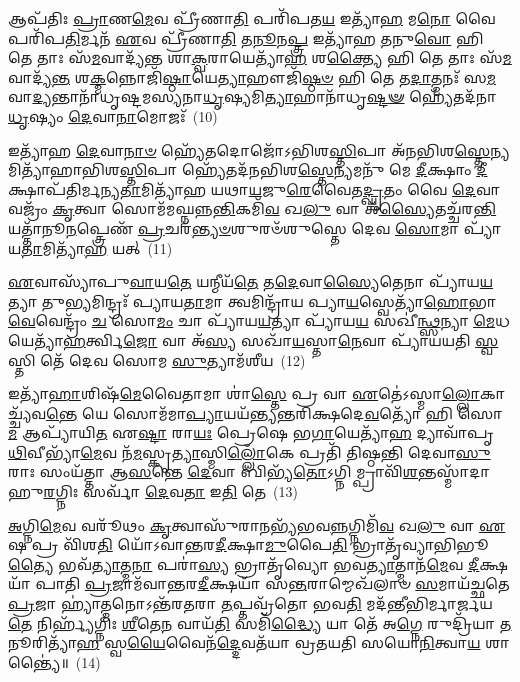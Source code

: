 𑌆𑌪᳴𑌤𑌿𑌃 \ul{𑌪𑍍𑌰𑌾}\-𑌣\-\ul{𑌮𑍇}\-𑌵 𑌪𑍍𑌰𑍀᳴𑌣𑌾\-\ul{𑌤𑌿} 𑌪𑌰𑌿᳴𑌪𑌤\-\ul{𑌯} 𑌇𑌤𑍍𑌯𑌾᳴\-\ul{𑌹} 𑌮\-\ul{𑌨𑍋} 𑌵𑍈 𑌪𑌰𑌿᳴𑌪\-\ul{𑌤𑌿}\-𑌰𑍍𑌮𑌨᳴ \ul{𑌏}\-𑌵 𑌪𑍍𑌰𑍀᳴𑌣𑌾\-\ul{𑌤𑌿} 𑌤\-\ul{𑌨𑍂}\-𑌨\-\ul{𑌪𑍍𑌤𑍍𑌰} 𑌇𑌤𑍍𑌯𑌾᳴𑌹 \ul{𑌤}\-𑌨𑍁\-\ul{𑌵𑍋} 𑌹𑌿 𑌤𑍇 𑌤𑌾𑌃 𑌸᳴\-\ul{𑌮}\-𑌵𑌾𑌦𑍍𑌯᳴𑌨𑍍𑌤 𑌶𑌾\-\ul{𑌕𑍍𑌵}\-𑌰𑌾𑌯𑍇𑌤𑍍𑌯𑌾᳴\-\ul{𑌹} 𑌶\-\ul{𑌕𑍍𑌤𑍍𑌯𑍈} 𑌹𑌿 𑌤𑍇 𑌤𑌾𑌃 𑌸᳴\-\ul{𑌮}\-𑌵𑌾𑌦𑍍𑌯᳴\-\ul{𑌨𑍍𑌤} 𑌶\-\ul{𑌕𑍍𑌮}\-𑌨𑍍𑌨𑍋𑌜𑌿᳴\-\ul{𑌷𑍍𑌠𑌾}\-𑌯𑍇\-\ul{𑌤𑍍𑌯𑌾}\-𑌹𑍗𑌜𑌿᳴\-\ul{𑌷𑍍𑌠}\-\-\ul{𑍞} 𑌹𑌿 𑌤𑍇 𑌤\-\ul{𑌦𑌾}\-𑌤𑍍𑌮𑌨𑌃᳴ 𑌸\-\ul{𑌮}\-𑌵𑌾\-\ul{𑌦𑍍𑌯}\-𑌨𑍍𑌤𑌾𑌨𑌾᳴𑌧𑍃𑌷𑍍𑌟𑌮𑌸𑍍𑌯𑌨𑌾\-\ul{𑌧𑍃}\-𑌷𑍍𑌯𑌮𑌿\-\ul{𑌤𑍍𑌯𑌾}\-𑌹𑌾𑌨𑌾᳴𑌧𑍃\-\ul{𑌷𑍍𑌟}\-\-\ul{𑍟} 𑌹𑍍𑌯𑍇᳴𑌤𑌦᳴𑌨𑌾\-\ul{𑌧𑍃}\-𑌷𑍍𑌯𑌂 \ul{𑌦𑍇}\-𑌵𑌾\-\ul{𑌨𑌾}\-𑌮𑍋𑌜𑌃᳴~(10)

𑌇𑌤𑍍𑌯𑌾᳴𑌹 \ul{𑌦𑍇}\-𑌵𑌾\-\ul{𑌨𑌾}\-\-\ul{𑍞} 𑌹𑍍𑌯𑍇᳴𑌤𑌦𑍋𑌜𑍋᳴\-𑌽𑌭𑌿𑌶\-\ul{𑌸𑍍𑌤𑌿}\-𑌪𑌾 𑌅᳴𑌨𑌭𑌿𑌶\-\ul{𑌸𑍍𑌤𑍇}\-𑌨𑍍𑌯𑌮𑌿𑌤𑍍𑌯𑌾᳴𑌹𑌾𑌭𑌿𑌶\-\ul{𑌸𑍍𑌤𑌿}\-𑌪𑌾 𑌹𑍍𑌯𑍇᳴𑌤𑌦᳴𑌨𑌭𑌿𑌶\-\ul{𑌸𑍍𑌤𑍇}\-𑌨𑍍𑌯𑌮𑌨𑍁᳴ 𑌮𑍇 \ul{𑌦𑍀}\-𑌕𑍍𑌷𑌾𑌂 \ul{𑌦𑍀}\-𑌕𑍍𑌷𑌾𑌪᳴𑌤𑌿𑌰𑍍𑌮𑌨𑍍𑌯\-\ul{𑌤𑌾}\-𑌮𑌿𑌤𑍍𑌯𑌾᳴𑌹 𑌯𑌥𑌾\-\ul{𑌯}\-𑌜𑍁\-\ul{𑌰𑍇}\-𑌵𑍈𑌤\-\ul{𑌦𑍍𑌘𑍃}\-𑌤𑌂 𑌵𑍈 \ul{𑌦𑍇}\-𑌵𑌾 𑌵𑌜𑍍𑌰𑌂᳴ \ul{𑌕𑍃}\-𑌤𑍍𑌵𑌾 𑌸𑍋𑌮᳴𑌮𑌘𑍍𑌨𑌨𑍍𑌨\-\ul{𑌨𑍍𑌤𑌿}\-𑌕𑌮𑌿᳴\-\ul{𑌵} 𑌖\-\ul{𑌲𑍁} 𑌵𑌾 𑌅᳴\-\ul{𑌸𑍍𑌯𑍈}\-𑌤𑌚𑍍𑌚᳴𑌰\-\ul{𑌨𑍍𑌤𑌿} 𑌯𑌤𑍍𑌤𑌾᳴𑌨𑍂\-\ul{𑌨}\-𑌪𑍍𑌤𑍍𑌰𑍇𑌣᳴ \ul{𑌪𑍍𑌰}\-𑌚𑌰᳴\-\ul{𑌨𑍍𑌤𑍍𑌯}\-\-\ul{𑍞}\-𑌶𑍁𑌰𑍞᳴𑌶𑍁𑌸𑍍𑌤𑍇 𑌦𑍇𑌵 \ul{𑌸𑍋}\-𑌮𑌾 𑌪𑍍𑌯𑌾᳴𑌯\-\ul{𑌤𑌾}\-𑌮𑌿𑌤𑍍𑌯𑌾᳴\-\ul{𑌹} 𑌯𑌤𑍍~(11)

\-\ul{𑌏}\-𑌵𑌾𑌸𑍍𑌯𑌾᳴𑌪𑍁\-\ul{𑌵𑌾}\-𑌯\-\ul{𑌤𑍇} 𑌯𑌨𑍍𑌮𑍀𑌯᳴\-\ul{𑌤𑍇} 𑌤\-\ul{𑌦𑍇}\-𑌵𑌾\-\ul{𑌸𑍍𑌯𑍈}\-𑌤𑍇𑌨𑌾 𑌪𑍍𑌯𑌾᳴𑌯\-\ul{𑌯}\-𑌤𑍍𑌯𑌾 𑌤𑍁\-\ul{𑌭𑍍𑌯}\-𑌮𑌿𑌨𑍍𑌦𑍍𑌰𑌃᳴ 𑌪𑍍𑌯𑌾𑌯\-\ul{𑌤𑌾}\-𑌮𑌾 𑌤𑍍𑌵𑌮𑌿𑌨𑍍𑌦𑍍𑌰𑌾᳴𑌯 𑌪𑍍𑌯𑌾\-\ul{𑌯}\-𑌸𑍍𑌵𑍇𑌤𑍍𑌯𑌾᳴\-\ul{𑌹𑍋}\-𑌭𑌾\-\ul{𑌵𑍇}\-𑌵𑍇𑌨𑍍𑌦𑍍𑌰𑌂᳴ \ul{𑌚} 𑌸𑍋\-\ul{𑌮𑌂} 𑌚𑌾 𑌪𑍍𑌯𑌾᳴𑌯\-\ul{𑌯}\-𑌤𑍍𑌯𑌾 𑌪𑍍𑌯𑌾᳴𑌯\-\ul{𑌯} 𑌸𑌖𑍀॑\-\ul{𑌨𑍍𑌥𑍍𑌸}\-𑌨𑍍𑌯𑌾 \ul{𑌮𑍇}\-𑌧𑌯𑍇𑌤𑍍𑌯𑌾᳴\-\ul{𑌹}\-𑌰𑍍𑌤𑍍𑌵𑌿\-\ul{𑌜𑍋} 𑌵𑌾 𑌅᳴\-\ul{𑌸𑍍𑌯} 𑌸𑌖𑌾᳴\-\ul{𑌯}\-𑌸𑍍𑌤𑌾\-\ul{𑌨𑍇}\-𑌵𑌾 𑌪𑍍𑌯𑌾᳴𑌯𑌯𑌤𑌿 \ul{𑌸𑍍𑌵}\-𑌸𑍍𑌤𑌿 𑌤𑍇᳴ 𑌦𑍇𑌵 𑌸𑍋𑌮 \ul{𑌸𑍁}\-𑌤𑍍𑌯𑌾𑌮᳴𑌶𑍀𑌯~(12)

𑌇𑌤𑍍𑌯𑌾᳴\-\ul{𑌹𑌾}\-𑌶𑌿𑌷᳴\-\ul{𑌮𑍇}\-𑌵𑍈𑌤𑌾𑌮𑌾 𑌶𑌾॑\-\ul{𑌸𑍍𑌤𑍇} 𑌪𑍍𑌰 𑌵𑌾 \ul{𑌏}\-𑌤𑍇॑\-𑌽𑌸𑍍𑌮𑌾\-\ul{𑌲𑍍𑌲𑍋}\-𑌕𑌾𑌚𑍍𑌚𑍍𑌯᳴𑌵\-\ul{𑌨𑍍𑌤𑍇} 𑌯𑍇 𑌸𑍋𑌮᳴𑌮𑌾\-\ul{𑌪𑍍𑌯𑌾}\-𑌯𑌯᳴𑌨𑍍𑌤𑍍𑌯𑌨𑍍𑌤𑌰𑌿𑌕𑍍𑌷𑌦𑍇\-\ul{𑌵}\-𑌤𑍍𑌯𑍋᳴ 𑌹𑌿 𑌸𑍋\-\ul{𑌮} 𑌆𑌪𑍍𑌯𑌾᳴𑌯𑌿\-\ul{𑌤} 𑌏\-\ul{𑌷𑍍𑌟𑌾} 𑌰𑌾\-\ul{𑌯𑌃} 𑌪𑍍𑌰𑍇𑌷𑍇 𑌭\-\ul{𑌗𑌾}\-𑌯𑍇𑌤𑍍𑌯𑌾᳴\-\ul{𑌹} 𑌦𑍍𑌯𑌾𑌵𑌾᳴𑌪𑍃\-\ul{𑌥𑌿}\-𑌵𑍀𑌭𑍍𑌯𑌾᳴\-\ul{𑌮𑍇}\-𑌵 𑌨᳴\-\ul{𑌮}\-𑌸𑍍𑌕𑍃\-\ul{𑌤𑍍𑌯𑌾}\-𑌸𑍍𑌮𑌿\-\ul{𑌲𑍍𑌲𑍋𑌁}\-𑌕𑍇 𑌪𑍍𑌰𑌤𑌿᳴ 𑌤𑌿𑌷𑍍𑌠𑌨𑍍𑌤𑌿 𑌦𑍇𑌵𑌾\-\ul{𑌸𑍁}\-𑌰𑌾𑌃 𑌸𑌂𑌯᳴𑌤𑍍𑌤𑌾 𑌆\-\ul{𑌸}\-𑌨𑍍𑌤𑍇 \ul{𑌦𑍇}\-𑌵𑌾 𑌬𑌿𑌭𑍍𑌯᳴\-\ul{𑌤𑍋}\-\-𑌽𑌗𑍍𑌨𑌿𑌮𑍍𑌪𑍍𑌰𑌾𑌵𑌿᳴\-\ul{𑌶}\-𑌨𑍍𑌤𑌸𑍍𑌮𑌾᳴𑌦𑌾𑌹𑍁\-\ul{𑌰}\-𑌗𑍍𑌨𑌿𑌃 𑌸𑌰𑍍𑌵𑌾᳴ \ul{𑌦𑍇}\-𑌵\-\ul{𑌤𑌾} 𑌇\-\ul{𑌤𑌿} 𑌤𑍇~(13)

\-\ul{𑌅}\-𑌗𑍍𑌨𑌿\-\ul{𑌮𑍇}\-𑌵 𑌵𑌰𑍂᳴𑌥𑌂 \ul{𑌕𑍃}\-𑌤𑍍𑌵𑌾𑌸𑍁᳴𑌰𑌾\-\ul{𑌨}\-𑌭𑍍𑌯᳴𑌭𑌵\-\ul{𑌨𑍍𑌨}\-𑌗𑍍𑌨𑌿𑌮𑌿᳴\-\ul{𑌵} 𑌖\-\ul{𑌲𑍁} 𑌵𑌾 \ul{𑌏}\-𑌷 𑌪𑍍𑌰 𑌵𑌿᳴𑌶\-\ul{𑌤𑌿} 𑌯𑍋᳴\-𑌽𑌵𑌾𑌨𑍍𑌤𑌰\-\ul{𑌦𑍀}\-𑌕𑍍𑌷𑌾\-\ul{𑌮𑍁}\-𑌪𑍈\-\ul{𑌤𑌿} 𑌭𑍍𑌰𑌾𑌤𑍃᳴𑌵𑍍𑌯𑌾𑌭𑌿𑌭𑍂\-\ul{𑌤𑍍𑌯𑍈} 𑌭𑌵᳴\-\ul{𑌤𑍍𑌯𑌾}\-𑌤𑍍𑌮\-\ul{𑌨𑌾} 𑌪𑌰𑌾॑\-\ul{𑌸𑍍𑌯} 𑌭𑍍𑌰𑌾𑌤𑍃᳴𑌵𑍍𑌯𑍋 𑌭𑌵\-\ul{𑌤𑍍𑌯𑌾}\-𑌤𑍍𑌮𑌾𑌨᳴\-\ul{𑌮𑍇}\-𑌵 \ul{𑌦𑍀}\-𑌕𑍍𑌷𑌯𑌾᳴ 𑌪𑌾𑌤𑌿 \ul{𑌪𑍍𑌰}\-𑌜𑌾𑌮᳴𑌵𑌾𑌨𑍍𑌤𑌰\-\ul{𑌦𑍀}\-𑌕𑍍𑌷𑌯𑌾᳴ 𑌸\-\ul{𑌨𑍍𑌤}\-𑌰𑌾𑌮𑍍𑌮𑍇𑌖᳴𑌲𑌾𑍞 \ul{𑌸}\-𑌮𑌾𑌯᳴𑌚𑍍𑌛𑌤𑍇 \ul{𑌪𑍍𑌰}\-𑌜𑌾 𑌹𑍍𑌯𑌾॑𑌤𑍍𑌮𑌨𑍋\-𑌽𑌨𑍍𑌤᳴𑌰𑌤𑌰𑌾 \ul{𑌤}\-𑌪𑍍𑌤𑌵𑍍𑌰᳴𑌤𑍋 𑌭𑌵\-\ul{𑌤𑌿} 𑌮𑌦᳴𑌨𑍍𑌤𑍀𑌭𑌿𑌰𑍍𑌮𑌾𑌰𑍍𑌜𑌯\-\ul{𑌤𑍇} 𑌨𑌿𑌰𑍍\mbox{}𑌹𑍍𑌯᳴𑌗𑍍𑌨𑌿𑌃 \ul{𑌶𑍀}\-𑌤𑍇\-\ul{𑌨} 𑌵𑌾𑌯᳴\-\ul{𑌤𑌿} 𑌸𑌮𑌿᳴\-\ul{𑌦𑍍𑌧𑍍𑌯𑍈} 𑌯𑌾 𑌤𑍇᳴ 𑌅\-\ul{𑌗𑍍𑌨𑍇} 𑌰𑍁𑌦𑍍𑌰𑌿᳴𑌯𑌾 \ul{𑌤}\-𑌨𑍂𑌰𑌿𑌤𑍍𑌯𑌾᳴\-\ul{𑌹} 𑌸𑍍𑌵\-\ul{𑌯𑍈}\-𑌵𑍈𑌨᳴\-\ul{𑌦𑍍𑌦𑍇}\-𑌵𑌤᳴𑌯𑌾 𑌵𑍍𑌰𑌤𑌯𑌤𑌿 𑌸𑌯𑍋\-\ul{𑌨𑌿}\-𑌤𑍍𑌵𑌾\-\ul{𑌯} 𑌶𑌾𑌨𑍍𑌤𑍍𑌯𑍈॑॥~(14)

